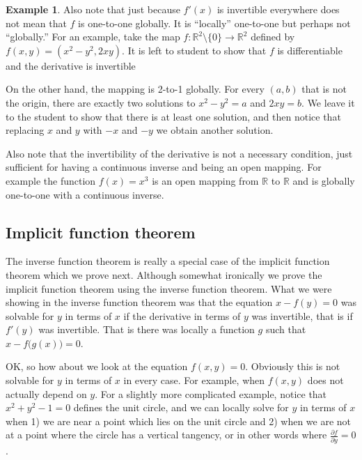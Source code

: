 \documentclass[12pt]{book}
\newcommand{\R}{{\mathbb{R}}}
\theoremstyle{plain}
\theoremstyle{remark}
\theoremstyle{definition}
\theoremstyle{exercise}
\theoremstyle{example}
\newtheorem{example}[thm]{Example}
\begin{document}
\begin{example}
Also note that just because $f'(x)$ is invertible everywhere does not
mean that $f$ is
one-to-one globally.  It is ``locally'' one-to-one but perhaps not
``globally.''  For an
example, take the map $f \colon \R^2 \setminus \{ 0 \} \to \R^2$ defined
by $f(x,y) = (x^2-y^2,2xy)$.
It is left to student to show that $f$ is
differentiable and the derivative is invertible

On the other hand, the mapping is 2-to-1 globally.  For every
$(a,b)$ that is not the origin, there are exactly two
solutions to $x^2-y^2=a$ and $2xy=b$.  We leave it to the student
to show that there is at least one solution, and then notice
that replacing $x$ and $y$ with $-x$ and $-y$ we obtain another solution.
\end{example}

Also note that the invertibility of the derivative is not a necessary
condition, just sufficient for having a continuous inverse and being an open
mapping.  For example the function $f(x) = x^3$ is an open mapping from $\R$
to $\R$ and is globally one-to-one with a continuous inverse.

\subsection{Implicit function theorem}

The inverse function theorem is really a special case of the implicit
function theorem which we prove next.  Although somewhat ironically we 
prove the implicit function theorem using the inverse function theorem.
What we were showing in the inverse function theorem was that
the equation $x-f(y) = 0$ was solvable for $y$ in terms of $x$ if the derivative
in terms of $y$ was invertible, that is if $f'(y)$ was invertible.
That is there was locally a
function $g$ such that $x-f\bigl(g(x)\bigr) = 0$.

OK, so how about we look at the equation $f(x,y) = 0$.  Obviously this is
not solvable for $y$ in terms of $x$ in every case.  For example,
when $f(x,y)$ does not actually depend on $y$.  For a slightly more
complicated example, notice that $x^2+y^2-1 = 0$ defines the unit circle, and
we can locally solve for $y$ in terms of $x$ when 1) we are near
a point which lies on the unit circle and 2) when we are not at a point
where the circle has a vertical tangency, or in other words where
$\frac{\partial f}{\partial y} = 0$.
\end{document}
